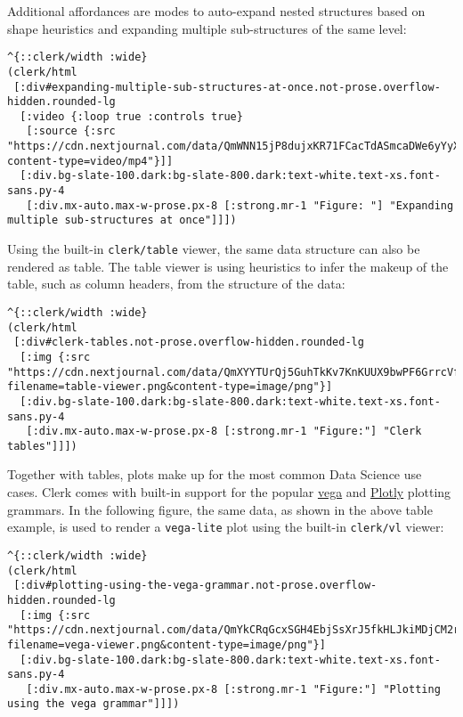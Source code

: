 \documentclass[
]{article}
\newcommand{\passthrough}[1]{#1}
\begin{document}
Additional affordances are modes to auto-expand nested structures based on shape heuristics and expanding multiple sub-structures of the same level:

\begin{lstlisting}
^{::clerk/width :wide}
(clerk/html
 [:div#expanding-multiple-sub-structures-at-once.not-prose.overflow-hidden.rounded-lg
  [:video {:loop true :controls true}
   [:source {:src "https://cdn.nextjournal.com/data/QmWNN15jP8dujxKR71FCacTdASmcaDWe6yYyXNDkA6ELwd?content-type=video/mp4"}]]
  [:div.bg-slate-100.dark:bg-slate-800.dark:text-white.text-xs.font-sans.py-4
   [:div.mx-auto.max-w-prose.px-8 [:strong.mr-1 "Figure: "] "Expanding multiple sub-structures at once"]]])
\end{lstlisting}

Using the built-in \passthrough{\lstinline!clerk/table!} viewer, the same data structure can also be rendered as table. The table viewer is using heuristics to infer the makeup of the table, such as column headers, from the structure of the data:

\begin{lstlisting}
^{::clerk/width :wide}
(clerk/html
 [:div#clerk-tables.not-prose.overflow-hidden.rounded-lg
  [:img {:src "https://cdn.nextjournal.com/data/QmXYYTUrQj5GuhTkKv7KnKUUX9bwPF6GrrcVfDy2YLfys4?filename=table-viewer.png&content-type=image/png"}]
  [:div.bg-slate-100.dark:bg-slate-800.dark:text-white.text-xs.font-sans.py-4
   [:div.mx-auto.max-w-prose.px-8 [:strong.mr-1 "Figure:"] "Clerk tables"]]])
\end{lstlisting}

Together with tables, plots make up for the most common Data Science use cases. Clerk comes with built-in support for the popular \href{https://github.com/vega/vega-embed}{vega} and \href{https://plotly.com/javascript/}{Plotly} plotting grammars. In the following figure, the same data, as shown in the above table example, is used to render a \passthrough{\lstinline!vega-lite!} plot using the built-in \passthrough{\lstinline!clerk/vl!} viewer:

\begin{lstlisting}
^{::clerk/width :wide}
(clerk/html
 [:div#plotting-using-the-vega-grammar.not-prose.overflow-hidden.rounded-lg
  [:img {:src "https://cdn.nextjournal.com/data/QmYkCRqGcxSGH4EbjSsXrJ5fkHLJkiMDjCM2rs7qH4oAPa?filename=vega-viewer.png&content-type=image/png"}]
  [:div.bg-slate-100.dark:bg-slate-800.dark:text-white.text-xs.font-sans.py-4
   [:div.mx-auto.max-w-prose.px-8 [:strong.mr-1 "Figure:"] "Plotting using the vega grammar"]]])
\end{lstlisting}
\end{document}

